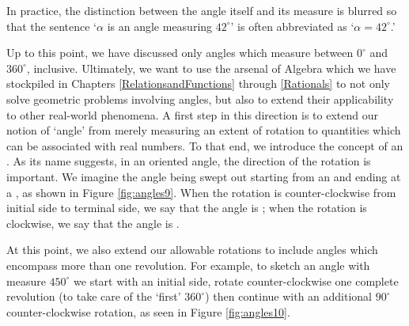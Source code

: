 In practice, the distinction between the angle itself and its measure is blurred so that the sentence `$\alpha$ is an angle measuring $42^{\circ}$' is often abbreviated as `$\alpha = 42^{\circ}$.' 

\smallskip

Up to this point, we have discussed only angles which measure between $0^{\circ}$ and $360^{\circ}$, inclusive.  Ultimately, we want to use the arsenal of Algebra which we have stockpiled in Chapters \ref{RelationsandFunctions} through \ref{Rationals} to not only solve geometric problems involving angles, but also to extend their applicability to other real-world phenomena.  A first step in this direction is to extend our notion of `angle' from merely measuring an extent of rotation to quantities which can be associated with real numbers.  To that end, we introduce the concept of an .  As its name suggests, in an oriented angle, the direction of the rotation is important.  We imagine the angle being swept out starting from an  and ending at a , as shown in Figure \ref{fig:angles9}.  When the rotation is counter-clockwise from initial side to terminal side, we say that the angle is ; when the rotation is clockwise, we say that the angle is .



At this point, we also extend our allowable rotations to include angles which encompass more than one revolution.  For example, to sketch an angle with measure $450^{\circ}$ we start with an initial side, rotate counter-clockwise one complete revolution (to take care of the `first' $360^{\circ}$) then continue with an additional $90^{\circ}$ counter-clockwise rotation, as seen in Figure \ref{fig:angles10}.



